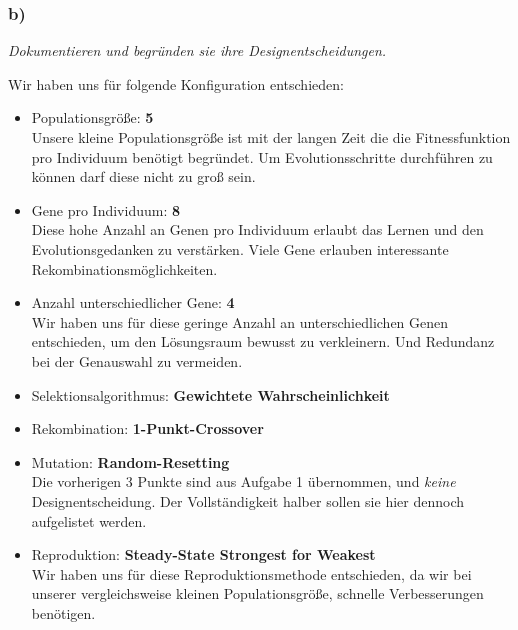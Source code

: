 \documentclass[12pt, a4paper]{article}
\begin{document}
\subsubsection*{b)}
\textit{Dokumentieren und begründen sie ihre Designentscheidungen.}

Wir haben uns für folgende Konfiguration entschieden:

\begin{itemize}
\item Populationsgröße: \textbf{5}\\
Unsere kleine Populationsgröße ist mit der langen Zeit die die
Fitnessfunktion pro Individuum benötigt begründet. Um
Evolutionsschritte durchführen zu können darf diese nicht zu groß sein.
\item Gene pro Individuum: \textbf{8}\\
Diese hohe Anzahl an Genen pro Individuum erlaubt das Lernen und den
Evolutionsgedanken zu verstärken. Viele Gene erlauben interessante Rekombinationsmöglichkeiten.
\item Anzahl unterschiedlicher Gene: \textbf{4}\\
Wir haben uns für diese geringe Anzahl an unterschiedlichen Genen
entschieden, um den Lösungsraum bewusst zu verkleinern. Und Redundanz
bei der Genauswahl zu vermeiden.
\item Selektionsalgorithmus: \textbf{Gewichtete Wahrscheinlichkeit}
\item Rekombination: \textbf{1-Punkt-Crossover}
\item Mutation: \textbf{Random-Resetting}\\
Die vorherigen 3 Punkte sind aus Aufgabe 1 übernommen, und
\textit{keine} Designentscheidung. Der Vollständigkeit halber sollen sie hier
dennoch aufgelistet werden.
\item Reproduktion: \textbf{Steady-State Strongest for Weakest}\\
Wir haben uns für diese Reproduktionsmethode entschieden, da wir bei
unserer vergleichsweise kleinen Populationsgröße, schnelle
Verbesserungen benötigen.

\end{itemize}
\end{document}
